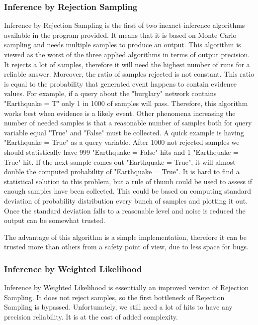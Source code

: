 \documentclass[10pt]{article}
\begin{document}
\subsubsection{Inference by Rejection Sampling}
Inference by Rejection Sampling is the first of two inexact inference algorithms available in the program provided. It means that it is based on Monte Carlo sampling and needs multiple samples to produce an output. This algorithm is viewed as the worst of the three applied algorithms in terms of output precision. It rejects a lot of samples, therefore it will need the highest number of runs for a reliable answer. Moreover, the ratio of samples rejected is not constant. This ratio is equal to the probability that generated event happens to contain evidence values. For example, if a query about the "burglary" network contains "Earthquake = T" only 1 in 1000 of samples will pass. Therefore, this algorithm works best when evidence is a likely event. Other phenomena increasing the number of needed samples is that a reasonable number of samples both for query variable equal "True" and "False" must be collected. A quick example is having "Earthquake = True" as a query variable. After 1000 not rejected samples we should statistically have 999 "Earthquake = False" hits and 1 "Earthquake = True" hit. If the next sample comes out "Earthquake = True", it will almost double the computed probability of "Earthquake = True". It is hard to find a statistical solution to this problem, but a rule of thumb could be used to assess if enough samples have been collected. This could be based on computing standard deviation of probability distribution every bunch of samples and plotting it out. Once the standard deviation falls to a reasonable level and noise is reduced the output can be somewhat trusted.

The advantage of this algorithm is a simple implementation, therefore it can be trusted more than others from a safety point of view, due to less space for bugs.

\subsubsection{Inference by Weighted Likelihood}
Inference by Weighted Likelihood is essentially an improved version of Rejection Sampling. It does not reject samples, so the first bottleneck of Rejection Sampling is bypassed. Unfortunately, we still need a lot of hits to have any precision reliability. It is at the cost of added complexity.
\end{document}
